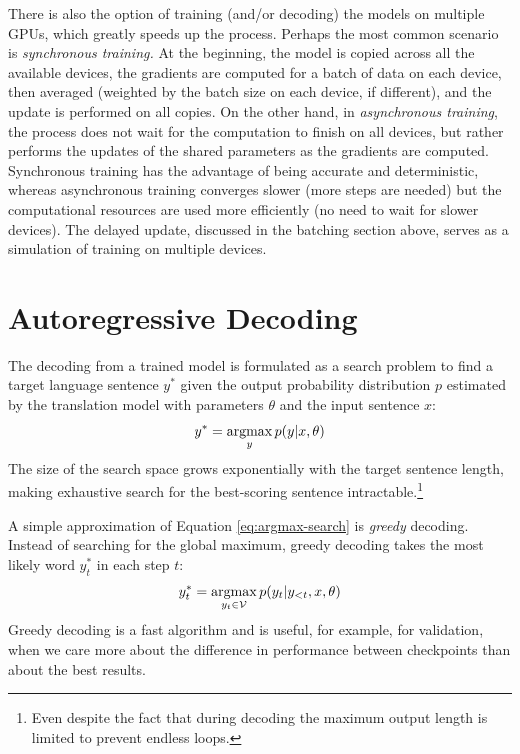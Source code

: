 There is also the option of training (and/or decoding) the models on multiple
GPUs, which greatly speeds up the process. Perhaps the most common scenario is
\emph{synchronous training.} At the beginning, the model is copied across all
the available devices, the gradients are computed for a batch of data on each
device, then averaged (weighted by the batch size on each device, if
different), and the update is performed on all copies. On the other hand, in
\emph{asynchronous training}, the process does not wait for the computation to
finish on all devices, but rather performs the updates of the shared parameters
as the gradients are computed. Synchronous training has the advantage of being
accurate and deterministic, whereas asynchronous training converges slower
(more steps are needed) but the computational resources are used more
efficiently (no need to wait for slower devices). The delayed update, discussed
in the batching section above, serves as a simulation of training on multiple
devices.

\section{Autoregressive Decoding}
\label{sec:decoding}

The decoding from a trained model is formulated as a search problem to find a
target language sentence $y^*$ given the output probability distribution $p$
estimated by the translation model with parameters $\theta$ and the input
sentence $x$:
%
\begin{equation}
  y^* = \operatorname*{argmax}_{y} p(y|x, \theta)
  \label{eq:argmax-search}
\end{equation}
%
The size of the search space grows exponentially with the target sentence
length, making exhaustive search for the best-scoring sentence
intractable.\footnote{Even despite the fact that during decoding the maximum
  output length is limited to prevent endless loops.}

A simple approximation of Equation \ref{eq:argmax-search} is \emph{greedy}
decoding. Instead of searching for the global maximum, greedy decoding takes
the most likely word $y_t^*$ in each step $t$:
%
\begin{equation}
  y_t^* = \operatorname*{argmax}_{y_t \in \mathcal{V}} p(y_t | y_{<t}, x, \theta)
  \label{eq:greedy-decoding}
\end{equation}
%
Greedy decoding is a fast algorithm and is useful, for example, for validation,
when we care more about the difference in performance between checkpoints than
about the best results.


